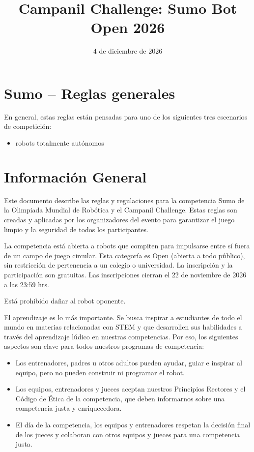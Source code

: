 \documentclass[12pt,a4paper]{article}
\title{Campanil Challenge: Sumo Bot Open 2026}
\author{}
\date{4 de diciembre de 2026}
\begin{document}
\maketitle

\section*{Sumo -- Reglas generales}

En general, estas reglas están pensadas para uno de los siguientes tres escenarios de competición:
\begin{itemize}
    \item robots totalmente autónomos
        \end{itemize}

\section{Información General}
Este documento describe las reglas y regulaciones para la competencia Sumo de la Olimpiada Mundial de Robótica y el Campanil Challenge. Estas reglas son creadas y aplicadas por los organizadores del evento para garantizar el juego limpio y la seguridad de todos los participantes.
\par
La competencia está abierta a robots que compiten para impulsarse entre sí fuera de un campo de juego circular. Esta categoría es Open (abierta a todo público), sin restricción de pertenencia a un colegio o universidad. La inscripción y la participación son gratuitas. Las inscripciones cierran el 22 de noviembre de 2026 a las 23:59 hrs.
\par
Está prohibido dañar al robot oponente.
\par
El aprendizaje es lo más importante. Se busca inspirar a estudiantes de todo el mundo en materias relacionadas con STEM y que desarrollen sus habilidades a través del aprendizaje lúdico en nuestras competencias. Por eso, los siguientes aspectos son clave para todos nuestros programas de competencia:
\begin{itemize}
    \item Los entrenadores, padres u otros adultos pueden ayudar, guiar e inspirar al equipo, pero no pueden construir ni programar el robot.
    \item Los equipos, entrenadores y jueces aceptan nuestros Principios Rectores y el Código de Ética de la competencia, que deben informarnos sobre una competencia justa y enriquecedora.
    \item El día de la competencia, los equipos y entrenadores respetan la decisión final de los jueces y colaboran con otros equipos y jueces para una competencia justa.
\end{itemize}
\end{document}
